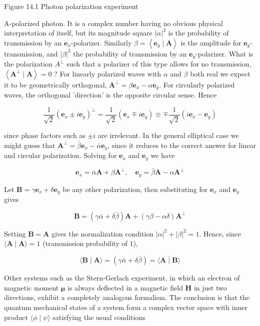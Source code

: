\documentclass[hyperref,UTF8]{ctexbook}
\begin{document}
Figure 14.1 Photon polarization experiment

A-polarized photon. It is a complex number having no obvious physical interpretation of itself, but its magnitude square $|\alpha|^{2}$ is the probability of transmission by an $\mathbf{e}_{x}$-polarizer. Similarly $\beta=\left\langle\mathbf{e}_{y} \mid \mathbf{A}\right\rangle$ is the amplitude for $\mathbf{e}_{y}$-transmission, and $|\beta|^{2}$ the probability of transmission by an $\mathbf{e}_{y}$-polarizer. What is the polarization $A^{\perp}$ such that a polarizer of this type allows for no transmission, $\left\langle\mathbf{A}^{\perp} \mid \mathbf{A}\right\rangle=0$ ? For linearly polarized waves with $\alpha$ and $\beta$ both real we expect it to be geometrically orthogonal, $\mathbf{A}^{\perp}=\beta \mathbf{e}_{x}-\alpha \mathbf{e}_{y}$. For circularly polarized waves, the orthogonal 'direction' is the opposite circular sense. Hence

$$
\frac{1}{\sqrt{2}}\left(\mathbf{e}_{x} \pm i \mathbf{e}_{y}\right)^{\perp}=\frac{1}{\sqrt{2}}\left(\mathbf{e}_{x} \mp i \mathbf{e}_{y}\right) \equiv \mp \frac{1}{\sqrt{2}}\left(i \mathbf{e}_{x}-\mathbf{e}_{y}\right)
$$

since phase factors such as $\pm i$ are irrelevant. In the general elliptical case we might guess that $\mathbf{A}^{\perp}=\bar{\beta} \mathbf{e}_{x}-\bar{\alpha} \mathbf{e}_{y}$, since it reduces to the correct answer for linear and circular polarization. Solving for $\mathbf{e}_{x}$ and $\mathbf{e}_{y}$ we have

$$
\mathbf{e}_{x}=\bar{\alpha} \mathbf{A}+\beta \mathbf{A}^{\perp}, \quad \mathbf{e}_{y}=\bar{\beta} \mathbf{A}-\alpha \mathbf{A}^{\perp}
$$

Let $\mathbf{B}=\gamma \mathbf{e}_{x}+\delta \mathbf{e}_{y}$ be any other polarization, then substituting for $\mathbf{e}_{x}$ and $\mathbf{e}_{y}$ gives

$$
\mathbf{B}=(\gamma \bar{\alpha}+\delta \bar{\beta}) \mathbf{A}+(\gamma \beta-\alpha \delta) \mathbf{A}^{\perp}
$$

Setting $\mathbf{B}=\mathbf{A}$ gives the normalization condition $|\alpha|^{2}+|\beta|^{2}=1$. Hence, since $\langle\mathbf{A} \mid \mathbf{A}\rangle=1$ (transmission probability of 1),

$$
\langle\mathbf{B} \mid \mathbf{A}\rangle=(\gamma \bar{\alpha}+\delta \bar{\beta})=\overline{\langle\mathbf{A} \mid \mathbf{B}\rangle}
$$

Other systems such as the Stern-Gerlach experiment, in which an electron of magnetic moment $\boldsymbol{\mu}$ is always deflected in a magnetic field $\mathbf{H}$ in just two directions, exhibit a completely analogous formalism. The conclusion is that the quantum mechanical states of a system form a complex vector space with inner product $\langle\phi \mid \psi\rangle$ satisfying the usual conditions
\end{document}
